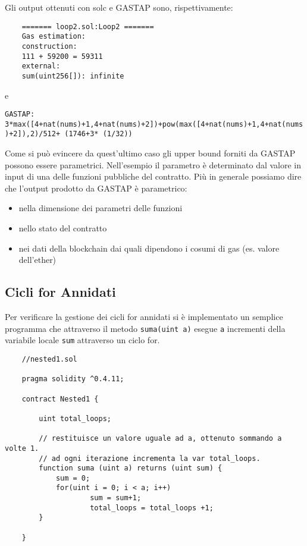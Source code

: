    
    Gli output ottenuti con solc e GASTAP sono, rispettivamente:
    
    \begin{minipage}{\linewidth}
    \begin{lstlisting}
    ======= loop2.sol:Loop2 =======
    Gas estimation:
    construction:
    111 + 59200 = 59311
    external:
    sum(uint256[]):	infinite
    \end{lstlisting}
    \end{minipage}

    
    e
    
    \verb|GASTAP: 3*max([4+nat(nums)+1,4+nat(nums)+2])+pow(max([4+nat(nums)+1,4+nat(nums)+2]),2)/512+ (1746+3* (1/32))|
    
    Come si può evincere da quest'ultimo caso gli upper bound forniti da GASTAP possono essere parametrici. Nell'esempio il parametro è determinato dal valore in input di una delle funzioni pubbliche del contratto.\newline
    \indent Più in generale possiamo dire che l'output prodotto da GASTAP è parametrico:
    \begin{itemize}
     \item nella dimensione dei parametri delle funzioni
     \item nello stato del contratto
     \item nei dati della blockchain dai quali dipendono i cosumi di gas (es. valore dell'ether)
    \end{itemize}


    
    \subsection{Cicli for Annidati}
    
    Per verificare la gestione dei cicli for annidati si è implementato un semplice programma che attraverso il metodo \verb|suma(uint a)| esegue \verb|a| incrementi della variabile locale \verb|sum| attraverso un ciclo for.
    
    \begin{minipage}{\linewidth}
    \begin{lstlisting}
    //nested1.sol

    pragma solidity ^0.4.11;

    contract Nested1 {

        uint total_loops;

        // restituisce un valore uguale ad a, ottenuto sommando a volte 1.
        // ad ogni iterazione incrementa la var total_loops.
        function suma (uint a) returns (uint sum) {
            sum = 0;
            for(uint i = 0; i < a; i++)
                    sum = sum+1;
                    total_loops = total_loops +1;          
        }

    }
    \end{lstlisting}
    \end{minipage}

